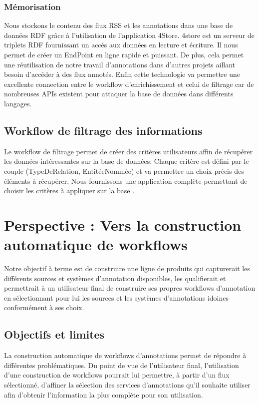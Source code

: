 \documentclass[]{easychair}
\newcommand{\comment}[4]{\par\noindent\hspace*{-0.5cm}{\parbox{\columnwidth}{\textbf{\color{#1}//#2[#3]:#4}}}\par}
\newcommand{\mi}[1]{\comment{blue}{}{#1}{MI}}
\begin{document}
\subsubsection{Mémorisation}
\mi{je ne sens pas cette partie.. à voir}
Nous stockons le contenu des flux RSS et les annotations dans une base de données RDF grâce à l'utilisation de l'application 4Store. 4store est un serveur de triplets RDF fournissant un accès aux données en lecture et écriture. Il nous permet de créer un EndPoint en ligne rapide et puissant. De plus, cela permet une réutilisation de notre travail d'annotations dans d'autres projets aillant besoin d'accéder à des flux annotés. Enfin cette technologie va permettre une excellente connection entre le workflow d'enrichissement et celui de filtrage car de nombreuses APIs existent pour attaquer la base de données dans différents langages.

\subsection{Workflow de filtrage des informations}
Le workflow de filtrage permet de créer des critères utilisateurs affin de récupérer les données intéressantes sur la base de données. Chaque critère est défini par le couple (TypeDeRelation, EntitéeNommée) et va permettre un choix précis des éléments à récupérer. Nous fournissons une application complète permettant de choisir les critères à appliquer sur la base \cite{Christophe}.


\section{Perspective : Vers la construction automatique de workflows }
\label{sect:perspectives}
Notre objectif à terme est de construire une ligne de produits qui capturerait les différents sources et systèmes d'annotation disponibles, les qualifierait et permettrait à un utilisateur final de construire ses propres workflows d'annotation en sélectionnant pour lui les sources et les systèmes d'annotations idoines conformément à ses choix.

\subsection{Objectifs et limites}

La construction automatique de workflows d'annotations permet de répondre à différentes problématiques. Du point de vue de l'utilisateur final, l'utilisation d'une construction de workflows pourrait lui permettre, à partir d'un flux sélectionné, d'affiner la sélection des services d'annotations qu'il souhaite utiliser afin d'obtenir l'information la plus complète pour son utilisation.
\end{document}
